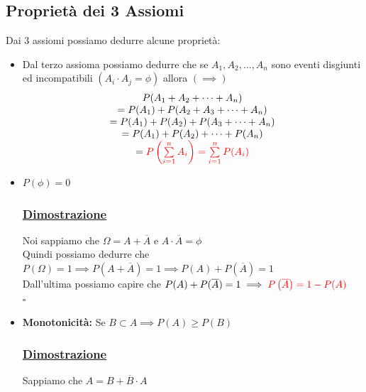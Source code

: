 \documentclass{article}
\begin{document}
\subsection{Proprietà dei 3 Assiomi}
Dai 3 assiomi possiamo dedurre alcune proprietà:
\begin{itemize}
    \item Dal terzo assioma possiamo dedurre che se $A_1, A_2 , \dots, A_n$ sono eventi disgiunti ed incompatibili $\left(A_i \cdot A_j = \phi\right)$ allora $\left(\implies \right)$ 
    \[\begin{matrix}
    P(A_1 + A_2 + \dots + A_n) \\
    = P(A_1) + P(A_2 + A_3 + \dots + A_n) \\
    = P(A_1) + P(A_2) + P(A_3 + \dots + A_n) \\
    = P(A_1) + P(A_2) + \dots + P(A_n) \\
    = \color{red} P\left( \sum\limits_{i = 1}^{n} A_i\right) = \sum\limits_{i = 1}^{n} P(A_i)
    \end{matrix}\]
    \item $P(\phi) = 0$ \\ 
    \subsubsection{\underline{Dimostrazione}} 
    Noi sappiamo che $\Omega = A + \overline{A} \text{ e } A \cdot \overline{A} = \phi$ \\
    Quindi possiamo dedurre che $P(\Omega) = 1 \implies P(A + \overline A) = 1 \implies P(A) + P(\overline A) = 1$ \\
    Dall'ultima possiamo capire che $P(A) + P(\overline A) = 1 \implies \color{red} P\left( \overline{A}\right) = 1 -P(A)$ \\ 
    \hspace*{0pt}\hfill $\square$ 
    \item \textbf{Monotonicità:} Se $B \subset A \implies P(A) \geq P(B)$ \\
    \subsubsection{\underline{Dimostrazione}} 
    Sappiamo che $A = B + \overline B \cdot A$ 
    \newpage

\end{itemize}
\end{document}
